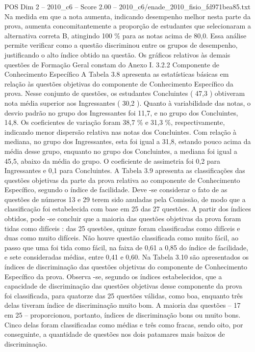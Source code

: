 \begin{textsample}{POS Dim 2 – 2010\_c6 – Score 2.00 – 2010\_c6/enade\_2010\_fisio\_fd971bea85.txt}
Na medida em que a nota aumenta, indicando desempenho melhor nesta parte da prova, aumenta concomitantemente a proporção de estudantes que selecionaram a alternativa correta B, atingindo 100 \% para as notas acima de 80,0.
Essa análise permite verificar como a questão discriminou entre os grupos de desempenho, justificando o alto índice obtido na questão.
Os gráficos relativos às demais questões de Formação Geral constam do Anexo I. 3.2.2 Componente de Conhecimento Específico A Tabela 3.8 apresenta as estatísticas básicas em relação às questões objetivas do componente de Conhecimento Específico da prova.
Nesse conjunto de questões, os estudantes Concluintes ( 47,3 ) obtiveram nota média superior aos Ingressantes ( 30,2 ).
Quanto à variabilidade das notas, o desvio padrão no grupo dos Ingressantes foi 11,7, e no grupo dos Concluintes, 14,8.
Os coeficientes de variação foram 38,7 \% e 31,3 \%, respectivamente, indicando menor dispersão relativa nas notas dos Concluintes.
Com relação à mediana, no grupo dos Ingressantes, esta foi igual a 31,8, estando pouco acima da média desse grupo, enquanto no grupo dos Concluintes, a mediana foi igual a 45,5, abaixo da média do grupo.
O coeficiente de assimetria foi 0,2 para Ingressantes e 0,1 para Concluintes.
A Tabela 3.9 apresenta as classificações das questões objetivas da parte da prova relativa ao componente de Conhecimento Específico, segundo o índice de facilidade.
Deve -se considerar o fato de as questões de números 13 e 29 terem sido anuladas pela Comissão, de modo que a classificação foi estabelecida com base em 25 das 27 questões.
A partir dos índices obtidos, pode -se concluir que a maioria das questões objetivas da prova foram tidas como difíceis : das 25 questões, quinze foram classificadas como difíceis e duas como muito difíceis.
Não houve questão classificada como muito fácil, ao passo que uma foi tida como fácil, na faixa de 0,61 a 0,85 do índice de facilidade, e sete consideradas médias, entre 0,41 e 0,60.
Na Tabela 3.10 são apresentados os índices de discriminação das questões objetivas do componente de Conhecimento Específico da prova.
Observa -se, segundo os índices estabelecidos, que a capacidade de discriminação das questões objetivas desse componente da prova foi classificada, para quatorze das 25 questões válidas, como boa, enquanto três delas tiveram índice de discriminação muito bom.
A maioria das questões – 17 em 25 – proporcionou, portanto, índices de discriminação bons ou muito bons.
Cinco delas foram classificadas como médias e três como fracas, sendo oito, por conseguinte, a quantidade de questões nos dois patamares mais baixos de discriminação.

\end{textsample}
